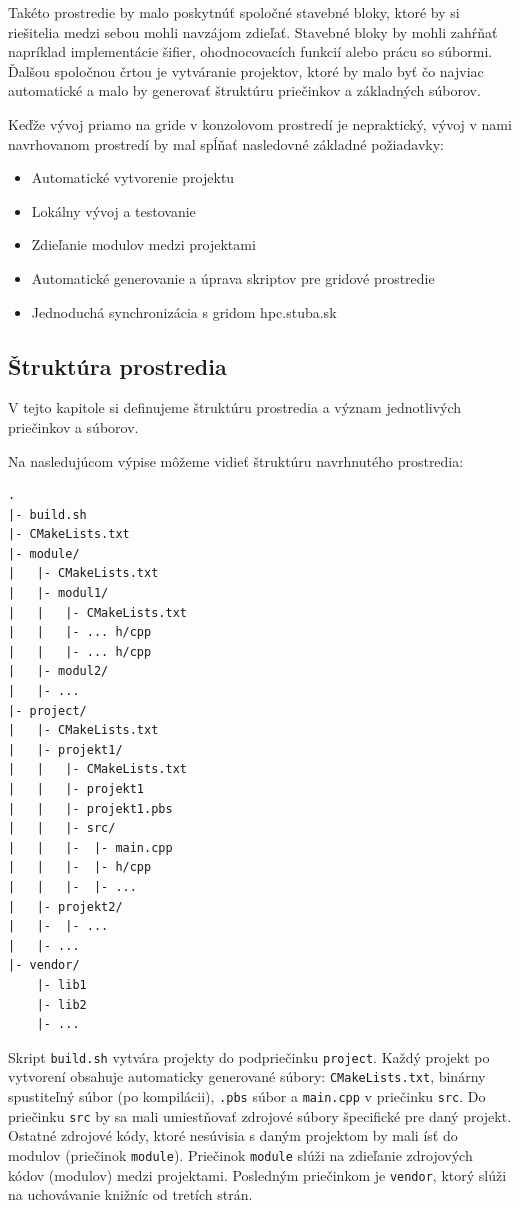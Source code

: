 Takéto prostredie by malo poskytnúť spoločné stavebné bloky, ktoré by si riešitelia medzi sebou mohli navzájom zdieľať.
Stavebné bloky by mohli zahŕňať napríklad implementácie šifier, ohodnocovacích funkcií alebo prácu so súbormi.
Ďalšou spoločnou črtou je vytváranie projektov, ktoré by malo byť čo najviac automatické a malo by generovať štruktúru priečinkov a základných súborov.

Keďže vývoj priamo na gride v konzolovom prostredí je nepraktický, vývoj v nami navrhovanom prostredí by mal spĺňať nasledovné
základné požiadavky:
\begin{itemize}
\item
  Automatické vytvorenie projektu
\item
  Lokálny vývoj a testovanie
\item
  Zdieľanie modulov medzi projektami
\item
  Automatické generovanie a úprava skriptov pre gridové prostredie
\item
  Jednoduchá synchronizácia s gridom hpc.stuba.sk
\end{itemize}

\subsection{Štruktúra prostredia}
V tejto kapitole si definujeme štruktúru prostredia a význam jednotlivých priečinkov a súborov.

Na nasledujúcom výpise môžeme vidieť štruktúru navrhnutého prostredia:
\begin{lstlisting}[caption={Štruktúra prostredia}, label={prop:struktura}]
.
|- build.sh
|- CMakeLists.txt
|- module/
|   |- CMakeLists.txt
|   |- modul1/
|   |   |- CMakeLists.txt
|   |   |- ... h/cpp
|   |   |- ... h/cpp
|   |- modul2/
|   |- ...
|- project/
|   |- CMakeLists.txt
|   |- projekt1/
|   |   |- CMakeLists.txt
|   |   |- projekt1
|   |   |- projekt1.pbs
|   |   |- src/
|   |   |-  |- main.cpp
|   |   |-  |- h/cpp
|   |   |-  |- ...
|   |- projekt2/
|   |-  |- ...
|   |- ...
|- vendor/
    |- lib1
    |- lib2
    |- ...
\end{lstlisting}

Skript \texttt{build.sh} vytvára projekty do podpriečinku \texttt{project}. Každý projekt po vytvorení obsahuje automaticky generované súbory:
\texttt{CMakeLists.txt}, binárny spustiteľný súbor (po kompilácii), \texttt{.pbs} súbor a \texttt{main.cpp} v priečinku \texttt{src}.
Do priečinku \texttt{src} by sa mali umiestňovať zdrojové súbory špecifické pre daný projekt.
Ostatné zdrojové kódy, ktoré nesúvisia s daným projektom by mali ísť do modulov (priečinok \texttt{module}).
Priečinok \texttt{module} slúži na zdieľanie zdrojových kódov (modulov) medzi projektami.
Posledným priečinkom je \texttt{vendor}, ktorý slúži na uchovávanie knižníc od tretích strán.
